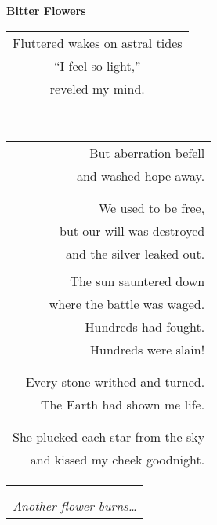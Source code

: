 \documentclass{article}
\begin{document}
\begin{center}
\textbf{Bitter Flowers} \\
\begin{tabular}{c}
\\
Fluttered wakes on astral tides \\
``I feel so light,'' \\
reveled my mind. \\
\end{tabular} \\
\begin{tabular}{r}
\\
But aberration befell \\
and washed hope away. \\
\\
\\
We used to be free, \\
but our will was destroyed \\
and the silver leaked out.%
\\
\\
The sun sauntered down \\
where the battle was waged. \\
Hundreds had fought. \\
Hundreds were slain! \\
\\
\\
Every stone writhed and turned. \\
The Earth had shown me life. \\
\\
\\
She plucked each star from the sky \\
and kissed my cheek goodnight. \\
\end{tabular}
\begin{tabular}{l}
\\
\\
\\
\textit{Another flower burns\ldots} \\

\end{tabular}
\end{center}
\end{document}
